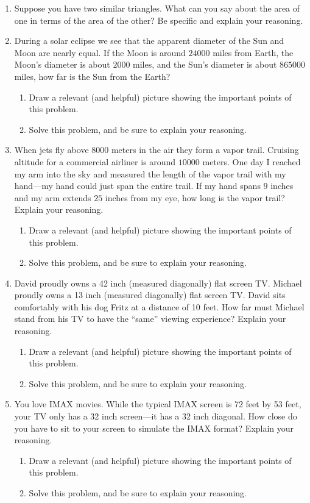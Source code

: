 \begin{enumerate}
\item Suppose you have two similar triangles. What can you say about
  the area of one in terms of the area of the other? Be specific and
  explain your reasoning.

\item During a solar eclipse we see that the apparent diameter of the
  Sun and Moon are nearly equal. If the Moon is around $24000$ miles
  from Earth, the Moon's diameter is about $2000$ miles, and the Sun's
  diameter is about $865000$ miles, how far is the Sun from the Earth?
\begin{enumerate}
\item Draw a relevant (and helpful) picture showing the important
  points of this problem.
\item Solve this problem, and be sure to explain your reasoning.
\end{enumerate}


\item When jets fly above $8000$ meters in the air they form a vapor
  trail. Cruising altitude for a commercial airliner is around $10000$
  meters. One day I reached my arm into the sky and measured the
  length of the vapor trail with my hand---my hand could just span the
  entire trail. If my hand spans $9$ inches and my arm extends $25$
  inches from my eye, how long is the vapor trail? Explain your
  reasoning.
\begin{enumerate}
\item Draw a relevant (and helpful) picture showing the important
  points of this problem.
\item Solve this problem, and be sure to explain your reasoning.
\end{enumerate}

\item David proudly owns a 42 inch (measured diagonally) flat screen
  TV. Michael proudly owns a 13 inch (measured diagonally) flat screen
  TV. David sits comfortably with his dog Fritz at a distance of 10
  feet. How far must Michael stand from his TV to have the ``same''
  viewing experience?  Explain your reasoning.
\begin{enumerate}
\item Draw a relevant (and helpful) picture showing the important
  points of this problem.
\item Solve this problem, and be sure to explain your reasoning.
\end{enumerate}

\item You love IMAX movies. While the typical IMAX screen is 72 feet
  by 53 feet, your TV only has a 32 inch screen---it has a 32 inch
  diagonal. How close do you have to sit to your screen to simulate
  the IMAX format? Explain your reasoning.
\begin{enumerate}
\item Draw a relevant (and helpful) picture showing the important
  points of this problem.
\item Solve this problem, and be sure to explain your reasoning.
\end{enumerate}


\end{enumerate}
